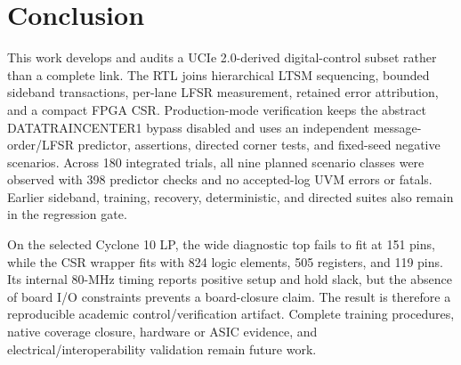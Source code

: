 \section{Conclusion}

This work develops and audits a UCIe 2.0-derived digital-control subset rather
than a complete link. The RTL joins hierarchical LTSM sequencing, bounded
sideband transactions, per-lane LFSR measurement, retained error attribution,
and a compact FPGA CSR. Production-mode verification keeps the abstract
DATATRAINCENTER1 bypass disabled and uses an independent message-order/LFSR
predictor, assertions, directed corner tests, and fixed-seed negative scenarios.
Across 180 integrated trials, all nine planned scenario classes were observed
with 398 predictor checks and no accepted-log UVM errors or fatals. Earlier
sideband, training, recovery, deterministic, and directed suites also remain in
the regression gate.

On the selected Cyclone 10 LP, the wide diagnostic top fails to fit at 151
pins, while the CSR wrapper fits with 824 logic elements, 505 registers, and
119 pins. Its internal 80-MHz timing reports positive setup and hold slack, but
the absence of board I/O constraints prevents a board-closure claim. The result
is therefore a reproducible academic control/verification artifact. Complete
training procedures, native coverage closure, hardware or ASIC evidence, and
electrical/interoperability validation remain future work.
